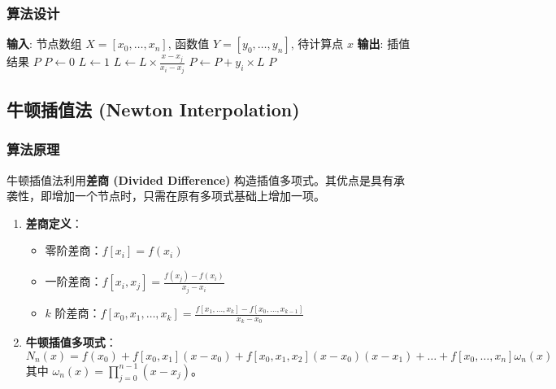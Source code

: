 \documentclass{article}
\begin{document}
\subsubsection{算法设计}
\begin{algorithm}[H]
\caption{计算拉格朗日插值多项式}
\begin{algorithmic}[1]
    \STATE \textbf{输入}: 节点数组 $X = [x_0, \dots, x_n]$, 函数值 $Y = [y_0, \dots, y_n]$, 待计算点 $x$
    \STATE \textbf{输出}: 插值结果 $P$
    \STATE $P \leftarrow 0$
        \STATE $L \leftarrow 1$
                \STATE $L \leftarrow L \times \frac{x - x_j}{x_i - x_j}$
            \ENDIF
        \ENDFOR
        \STATE $P \leftarrow P + y_i \times L$
    \ENDFOR
    \RETURN $P$
\end{algorithmic}
\end{algorithm}

\subsection{牛顿插值法 (Newton Interpolation)}

\subsubsection{算法原理}
牛顿插值法利用\textbf{差商 (Divided Difference)} 构造插值多项式。其优点是具有承袭性，即增加一个节点时，只需在原有多项式基础上增加一项。

\begin{enumerate}
    \item \textbf{差商定义}：
    \begin{itemize}
        \item 零阶差商：$f[x_i] = f(x_i)$
        \item 一阶差商：$f[x_i, x_j] = \frac{f(x_j) - f(x_i)}{x_j - x_i}$
        \item $k$ 阶差商：$f[x_0, x_1, \dots, x_k] = \frac{f[x_1, \dots, x_k] - f[x_0, \dots, x_{k-1}]}{x_k - x_0}$
    \end{itemize}
    
    \item \textbf{牛顿插值多项式}：
    \begin{equation}
    N_n(x) = f(x_0) + f[x_0, x_1](x - x_0) + f[x_0, x_1, x_2](x - x_0)(x - x_1) + \dots + f[x_0, \dots, x_n]\omega_n(x)
    \end{equation}
    其中 $\omega_n(x) = \prod_{j=0}^{n-1}(x - x_j)$。
\end{enumerate}
\end{document}
